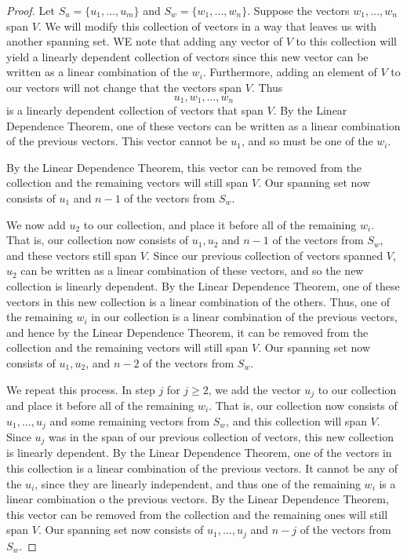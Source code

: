 \documentclass{article}
\begin{document}
  \begin{proof}
    Let $S_u = \{u_1, \ldots, u_m\}$ and $S_w = \{w_1, \ldots, w_n\}$. Suppose the vectors $w_1, \ldots, w_n$ span $V$. We will modify this collection of vectors in a way that leaves us with another spanning set. WE note that adding any vector of $V$ to this collection will yield a linearly dependent collection of vectors since this new vector can be written as a linear combination of the $w_i$. Furthermore, adding an element of $V$ to our vectors will not change that the vectors span $V$. Thus
    \[
      u_1, w_1, \ldots, w_n
    \]
    is a linearly dependent collection of vectors that span $V$. By the Linear Dependence Theorem, one of these vectors can be written as a linear combination of the previous vectors. This vector cannot be $u_1$, and so must be one of the $w_i$.

    By the Linear Dependence Theorem, this vector can be removed from the collection and the remaining vectors will still span $V$. Our spanning set now consists of $u_1$ and $n-1$ of the vectors from $S_w$.

    We now add $u_2$ to our collection, and place it before all of the remaining $w_i$. That is, our collection now consists of $u_1, u_2$ and $n-1$ of the vectors from $S_w$, and these vectors still span $V$. Since our previous collection of vectors spanned $V$, $u_2$ can be written as a linear combination of these vectors, and so the new collection is linearly dependent. By the Linear Dependence Theorem, one of these vectors in this new collection is a linear combination of the others. Thus, one of the remaining $w_i$ in our collection is a linear combination of the previous vectors, and hence by the Linear Dependence Theorem, it can be removed from the collection and the remaining vectors will still span $V$. Our spanning set now consists of $u_1, u_2$, and $n-2$ of the vectors from $S_w$.

    We repeat this process. In step $j$ for $j \geq 2$, we add the vector $u_j$ to our collection and place it before all of the remaining $w_i$. That is, our collection now consists of $u_1, \ldots, u_j$ and some remaining vectors from $S_w$, and this collection will span $V$. Since $u_j$ was in the span of our previous collection of vectors, this new collection is linearly dependent. By the Linear Dependence Theorem, one of the vectors in this collection is a linear combination of the previous vectors. It cannot be any of the $u_i$, since they are linearly independent, and thus one of the remaining $w_i$ is a linear combination o the previous vectors. By the Linear Dependence Theorem, this vector can be removed from the collection and the remaining ones will still span $V$. Our spanning set now consists of $u_1, \ldots, u_j$ and $n-j$ of the vectors from $S_w$.


\end{proof}
\end{document}

